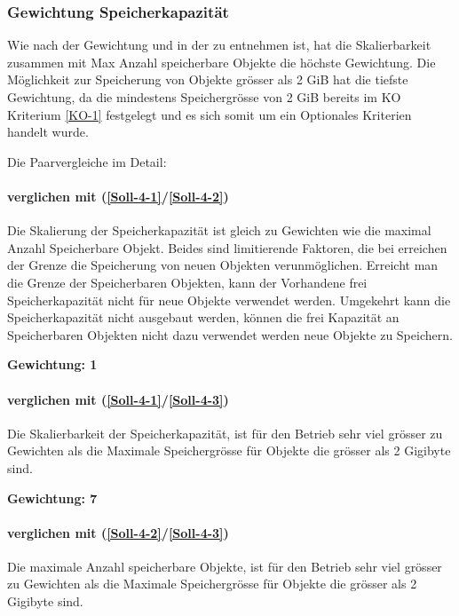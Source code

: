 \subsubsection{Gewichtung Speicherkapazität}


Wie nach der Gewichtung und in der  zu entnehmen ist, hat die Skalierbarkeit zusammen mit Max Anzahl speicherbare Objekte die höchste Gewichtung. Die Möglichkeit zur Speicherung von Objekte grösser als 2 GiB hat die tiefste Gewichtung, da die mindestens Speichergrösse von 2 GiB bereits im KO Kriterium \ref{KO-1} festgelegt und es sich somit um ein Optionales Kriterien handelt wurde.

Die Paarvergleiche im Detail:

\paragraph*{ verglichen mit  (\ref{Soll-4-1}/\ref{Soll-4-2})}
Die Skalierung der Speicherkapazität ist gleich zu Gewichten wie die maximal Anzahl Speicherbare Objekt. Beides sind limitierende Faktoren, die bei erreichen der Grenze die Speicherung von neuen Objekten verunmöglichen. Erreicht man die Grenze der Speicherbaren Objekten, kann der Vorhandene frei Speicherkapazität nicht für neue Objekte verwendet werden. Umgekehrt kann die Speicherkapazität nicht ausgebaut werden, können die frei Kapazität an Speicherbaren Objekten nicht dazu verwendet werden neue Objekte zu Speichern.

\textbf{Gewichtung: 1}

\paragraph*{ verglichen mit  (\ref{Soll-4-1}/\ref{Soll-4-3})}
Die Skalierbarkeit der Speicherkapazität, ist für den Betrieb sehr viel grösser zu Gewichten als die Maximale Speichergrösse für Objekte die grösser als 2 Gigibyte sind.

\textbf{Gewichtung: 7}

\paragraph*{ verglichen mit  (\ref{Soll-4-2}/\ref{Soll-4-3})}
Die maximale Anzahl speicherbare Objekte, ist für den Betrieb sehr viel grösser zu Gewichten als die Maximale Speichergrösse für Objekte die grösser als 2 Gigibyte sind.

